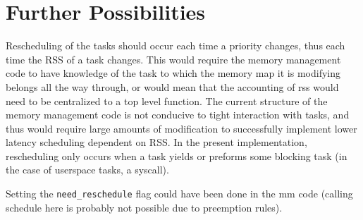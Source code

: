 \documentclass[10pt]{article}
\begin{document}
\section{Further Possibilities}

Rescheduling of the tasks should occur each time a priority changes, thus
each time the RSS of a task changes. This would require the memory
management code to have knowledge of the task to which the memory map it
is modifying belongs all the way through, or would mean that the
accounting of rss would need to be centralized to a top level function.
The current structure of the memory management code is not conducive to
tight interaction with tasks, and thus would require large amounts of
modification to successfully implement lower latency scheduling dependent
on RSS. In the present implementation, rescheduling only occurs when a
task yields or preforms some blocking task (in the case of userspace
tasks, a syscall).

Setting the \texttt{need\_reschedule} flag could have been done in the mm
code (calling schedule here is probably not possible due to preemption
rules).
\end{document}
